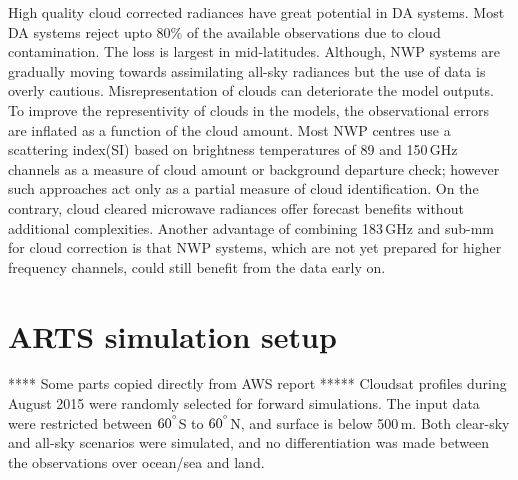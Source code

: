 \documentclass[amt, manuscript]{copernicus}
\begin{document}
High quality cloud corrected radiances have great potential in DA systems. Most DA systems reject upto 80\% of the available observations due to cloud contamination. The loss is largest in mid-latitudes. Although, NWP systems are gradually moving towards assimilating all-sky radiances but the use of data is overly cautious. Misrepresentation of clouds can deteriorate the model outputs. To improve the representivity of clouds in the models, the observational errors are inflated as a function of the cloud amount. Most NWP centres use a scattering index(SI) based on brightness temperatures of 89 and 150\,GHz channels as a measure of cloud amount or background departure check; however such approaches act only as a partial measure of cloud identification. On the contrary, cloud cleared microwave radiances offer forecast benefits without additional complexities. Another advantage of combining 183\,GHz and sub-mm for cloud correction is that NWP systems, which are not yet prepared for higher frequency channels, could still benefit from the data early on. 

















\appendix
\section{ARTS simulation setup}    %
\label{appendix:ARTS_setup}
%
**** Some parts copied directly from AWS report *****
Cloudsat profiles during August 2015 were randomly selected for forward simulations. The input data were restricted between $60^{^{\circ}}$S to $60^{^{\circ}}$N, and surface is below 500\,m. Both clear-sky and all-sky scenarios were simulated, and no differentiation was made between the observations over ocean/sea and land. 
\end{document}
